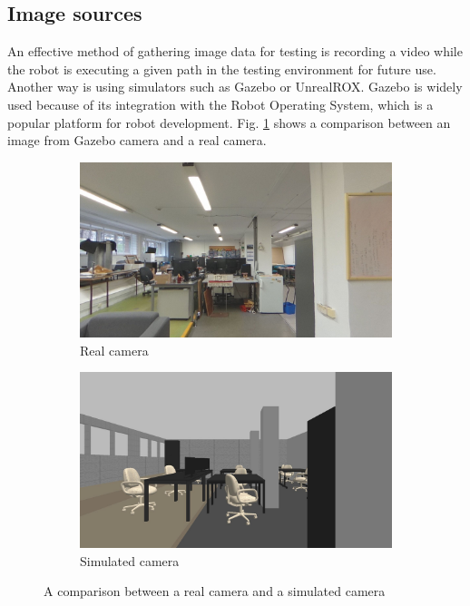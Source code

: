 \documentclass{svproc}
\begin{document}
\subsection{Image sources}
An effective method of gathering image data for testing is recording a video while the robot is executing a given path in the testing environment for future use.
Another way is using simulators such as Gazebo or UnrealROX. \cite{koenig2004design,martinez2018unrealrox}
Gazebo is widely used because of its integration with the Robot Operating System, which is a popular platform for robot development.
Fig. \ref{fig:gazebo_vs_real} shows a comparison between an image from Gazebo camera and a real camera.
\begin{figure}[!ht]
    \begin{subfigure}{0.46\textwidth}
        \includegraphics[width=\linewidth]{img/gazebo_vs_real/real.jpg}
        \caption{Real camera}
    \end{subfigure}\hfill%
    \begin{subfigure}{0.46\textwidth}
        \includegraphics[width=\linewidth]{img/gazebo_vs_real/gazebo.jpg}
        \caption{Simulated camera}
    \end{subfigure}
    \caption{A comparison between a real camera and a simulated camera}
    \label{fig:gazebo_vs_real}
\end{figure}
\end{document}
